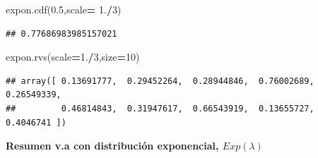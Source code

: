 \documentclass[]{book}
\newenvironment{Shaded}{\begin{snugshade}}{\end{snugshade}}
\newcommand{\DecValTok}[1]{\textcolor[rgb]{0.00,0.00,0.81}{#1}}
\newcommand{\FloatTok}[1]{\textcolor[rgb]{0.00,0.00,0.81}{#1}}
\newcommand{\NormalTok}[1]{#1}
\newcommand{\OperatorTok}[1]{\textcolor[rgb]{0.81,0.36,0.00}{\textbf{#1}}}
\begin{document}
\begin{Shaded}
\begin{Highlighting}[]
\NormalTok{expon.cdf(}\FloatTok{0.5}\NormalTok{,scale}\OperatorTok{=} \FloatTok{1.}\OperatorTok{/}\DecValTok{3}\NormalTok{) }
\end{Highlighting}
\end{Shaded}

\begin{verbatim}
## 0.77686983985157021
\end{verbatim}

\begin{Shaded}
\begin{Highlighting}[]
\NormalTok{expon.rvs(scale}\OperatorTok{=}\FloatTok{1.}\OperatorTok{/}\DecValTok{3}\NormalTok{,size}\OperatorTok{=}\DecValTok{10}\NormalTok{)}
\end{Highlighting}
\end{Shaded}

\begin{verbatim}
## array([ 0.13691777,  0.29452264,  0.28944846,  0.76002689,  0.26549339,
##         0.46814843,  0.31947617,  0.66543919,  0.13655727,  0.4046741 ])
\end{verbatim}

\textbf{Resumen v.a con distribución exponencial, \(Exp(\lambda)\)}
\end{document}
